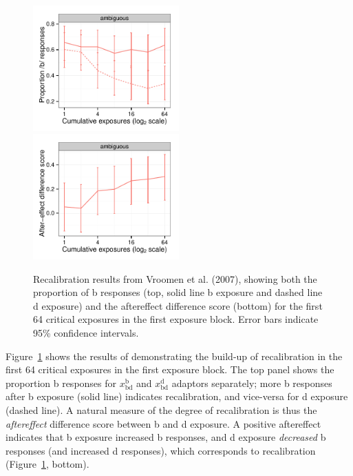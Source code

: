 \begin{figure}[htb]
  \centering
  \includegraphics[width=0.5\textwidth]{vroomen-bd-recal-first-64.pdf}
  \includegraphics[width=0.5\textwidth]{vroomen-ae-recal-first-64.pdf}
  \caption{Recalibration results from Vroomen et al. (2007), showing both the proportion of \ph b responses (top, solid line \ph b exposure and dashed line \ph d exposure) and the aftereffect difference score (bottom) for the first 64 critical exposures in the first exposure block. Error bars indicate 95\% confidence intervals.}
  \label{fig:vroomen-results-64-recal}
\end{figure}

Figure~\ref{fig:vroomen-results-64-recal} shows the results of  demonstrating the build-up of recalibration in the first 64 critical exposures in the first exposure block.  The top panel shows the proportion \ph b responses for $x_\mathrm{bd}^\mathrm{b}$ and $x_\mathrm{bd}^\mathrm{d}$ adaptors separately; more \ph b responses after \ph b exposure (solid line) indicates recalibration, and vice-versa for \ph d exposure (dashed line).  A natural measure of the degree of recalibration is thus the \emph{aftereffect} difference score between \ph b and \ph d exposure.  A positive aftereffect indicates that \ph b exposure increased \ph b responses, and \ph d exposure \emph{decreased} \ph b responses (and increased \ph d responses), which corresponds to recalibration (Figure~\ref{fig:vroomen-results-64-recal}, bottom).

